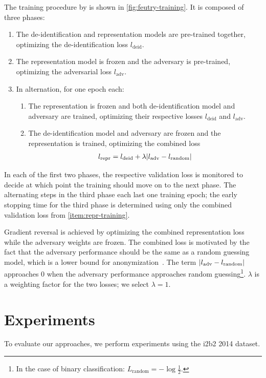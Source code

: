 %
The training procedure by \citet{feutry2018learning} is shown in \cref{fig:feutry-training}.
%
It is composed of three phases:
%
\begin{enumerate}[label=P\arabic*.,ref=P\arabic*]
    \item The de-identification and representation models are pre-trained together, optimizing the de-identification loss $l_{\text{deid}}$.
    \item The representation model is frozen and the adversary is pre-trained, optimizing the adversarial loss $l_{\text{adv}}$.
    \item In alternation, for one epoch each:
    \begin{enumerate}
        \item The representation is frozen and both de-identification model and adversary are trained, optimizing their respective losses $l_{\text{deid}}$ and $l_{\text{adv}}$.
        \item The de-identification model and adversary are frozen and the representation is trained, optimizing the combined loss
        \begin{align}
            l_{\text{repr}} = l_{\text{deid}} + \lambda \lvert l_{\text{adv}} - l_{\text{random}}\rvert
        \end{align}
        \label{item:repr-training}
    \end{enumerate}
\end{enumerate}
%
In each of the first two phases, the respective validation loss is monitored to decide at which point the training should move on to the next phase.
%
The alternating steps in the third phase each last one training epoch; the early stopping time for the third phase is determined using only the combined validation loss from \ref{item:repr-training}.

%
Gradient reversal is achieved by optimizing the combined representation loss while the adversary weights are frozen.
%
The combined loss is motivated by the fact that the adversary performance should be the same as a random guessing model, which is a lower bound for anonymization~\citep{feutry2018learning}.
%
The term $\lvert l_{\text{adv}} - l_{\text{random}}\rvert$ approaches $0$ when the adversary performance approaches random guessing\footnote{In the case of binary classification: $L_{\text{random}} = -\log \frac{1}{2}$.}.
%
$\lambda$ is a weighting factor for the two losses; we select $\lambda=1$.

\section{Experiments}
%
To evaluate our approaches, we perform experiments using the i2b2 2014 dataset.

